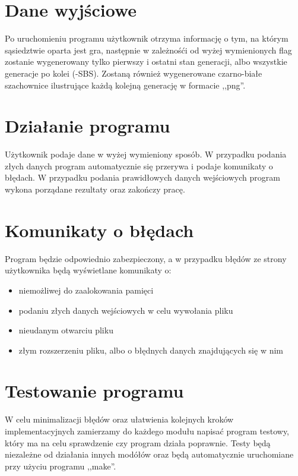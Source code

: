 \documentclass{article}
\begin{document}
\section{Dane wyjściowe}
{\fontsize{14}{14}\selectfont 
Po uruchomieniu programu użytkownik otrzyma informację o tym, na którym sąsiedztwie oparta jest gra, następnie w zależnośći od wyżej wymienionych flag zostanie wygenerowany tylko pierwszy i ostatni stan generacji, albo wszystkie generacje po kolei (-SBS). Zostaną również wygenerowane czarno-białe szachownice ilustrujące każdą kolejną generację w formacie ,,png''.}
\section{Działanie programu}
{\fontsize{14}{14}\selectfont 
Użytkownik podaje dane w wyżej wymieniony sposób. W przypadku podania złych danych program automatycznie się przerywa i podaje komunikaty o błędach.
\newline 
W przypadku podania prawidłowych danych wejściowych program wykona porządane rezultaty oraz zakończy pracę. }

\section{Komunikaty o błędach}
{\fontsize{14}{14}\selectfont 
Program będzie odpowiednio zabezpieczony, a w przypadku błędów ze strony użytkownika będą wyświetlane komunikaty o:
\begin{itemize}
\item niemożliwej do zaalokowania pamięci
\item podaniu złych danych wejściowych w celu wywołania pliku
\item  nieudanym otwarciu pliku
\item  złym rozszerzeniu pliku, albo o błędnych danych znajdujących się w nim
\end{itemize}

}

\section{Testowanie programu}
{\fontsize{14}{14}\selectfont
W celu minimalizacji błędów oraz ułatwienia kolejnych kroków implementacyjnych zamierzamy do każdego modułu napisać program testowy, który ma na celu sprawdzenie czy program działa poprawnie.
Testy będą niezależne od działania innych modółów oraz będą automatycznie uruchomiane przy użyciu programu ,,make''.}
\end{document}
